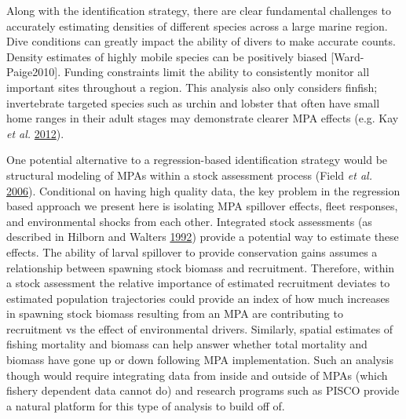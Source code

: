 \documentclass[twoside,12pt,final]{ucthesis-CA2012}
\begin{document}
\begin{ucmainmatter}
Along with the identification strategy, there are clear fundamental
challenges to accurately estimating densities of different species
across a large marine region. Dive conditions can greatly impact the
ability of divers to make accurate counts. Density estimates of highly
mobile species can be positively biased {[}Ward-Paige2010{]}. Funding
constraints limit the ability to consistently monitor all important
sites throughout a region. This analysis also only considers finfish;
invertebrate targeted species such as urchin and lobster that often have
small home ranges in their adult stages may demonstrate clearer MPA
effects (e.g. Kay \emph{et al.} \protect\hyperlink{ref-Kay2012}{2012}).

One potential alternative to a regression-based identification strategy
would be structural modeling of MPAs within a stock assessment process
(Field \emph{et al.} \protect\hyperlink{ref-Field2006}{2006}).
Conditional on having high quality data, the key problem in the
regression based approach we present here is isolating MPA spillover
effects, fleet responses, and environmental shocks from each other.
Integrated stock assessments (as described in Hilborn and Walters
\protect\hyperlink{ref-Hilborn1992}{1992}) provide a potential way to
estimate these effects. The ability of larval spillover to provide
conservation gains assumes a relationship between spawning stock biomass
and recruitment. Therefore, within a stock assessment the relative
importance of estimated recruitment deviates to estimated population
trajectories could provide an index of how much increases in spawning
stock biomass resulting from an MPA are contributing to recruitment vs
the effect of environmental drivers. Similarly, spatial estimates of
fishing mortality and biomass can help answer whether total mortality
and biomass have gone up or down following MPA implementation. Such an
analysis though would require integrating data from inside and outside
of MPAs (which fishery dependent data cannot do) and research programs
such as PISCO provide a natural platform for this type of analysis to
build off of.


\end{ucmainmatter}
\end{document}
